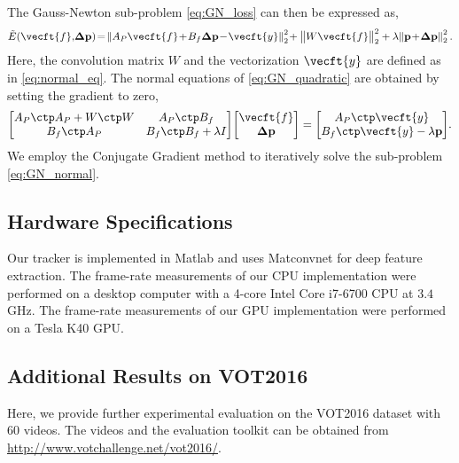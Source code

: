 \documentclass[10pt,twocolumn,letterpaper]{article}
\begin{document}
The Gauss-Newton sub-problem \eqref{eq:GN_loss} can then be expressed as,
\begin{equation}
	\label{eq:GN_quadratic}
	\tilde{E}(\vecft{f}, \!\mathbf{\Delta p}) \!=\! \left\| A_P \vecft{f} \!+\! B_f \mathbf{\Delta p} \!-\! \vecft{y} \right\|_2^2\! + \big\| W \vecft{f} \big\|^2_2 + \lambda \!\left\| \mathbf{p} \!+\! \mathbf{\Delta p} \right\|_2^2.
\end{equation}
Here, the convolution matrix $W$ and the vectorization $\vecft{y}$ are defined as in \eqref{eq:normal_eq}. The normal equations of \eqref{eq:GN_quadratic} are obtained by setting the gradient to zero,
\begin{equation}
	\label{eq:GN_normal}
	\begin{bmatrix}
		A_P\ctp A_P + W\ctp W & A_P\ctp B_f \\ B_f\ctp A_P & B_f\ctp B_f + \lambda I
	\end{bmatrix}\!
	\begin{bmatrix}
		\vecft{f} \\ \mathbf{\Delta p}
	\end{bmatrix}
	=
	\begin{bmatrix}
		A_P\ctp \vecft{y} \\ B_f\ctp \vecft{y} - \lambda \mathbf{p}
	\end{bmatrix}
	\!.
\end{equation}
We employ the Conjugate Gradient method to iteratively solve the sub-problem \eqref{eq:GN_normal}.

\subsection*{Hardware Specifications}
\label{sec:supp_hw}

Our tracker is implemented in Matlab and uses Matconvnet \cite{matconvnet} for deep feature extraction. The frame-rate measurements of our CPU implementation were performed on a desktop computer with a 4-core Intel Core i7-6700 CPU at $3.4$ GHz. The frame-rate measurements of our GPU implementation were performed on a Tesla K40 GPU.

\subsection*{Additional Results on VOT2016}
\label{sec:supp_VOT}
Here, we provide further experimental evaluation on the VOT2016 dataset \cite{VOT2016} with 60 videos. The videos and the evaluation toolkit can be obtained from \url{http://www.votchallenge.net/vot2016/}.
\end{document}
